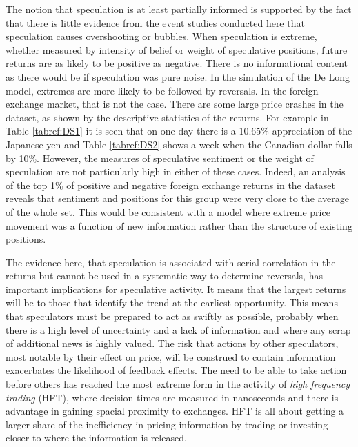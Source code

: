 \documentclass[12pt, a4paper, oneside]{article} %
\begin{document}
The notion that speculation is at least partially informed is supported by the fact that there is little evidence from the event studies conducted here that speculation causes overshooting or bubbles.  When speculation is extreme, whether measured by intensity of belief or weight of speculative positions, future returns are as likely to be positive as negative.  There is no informational content as there would be if speculation was pure noise.  In the simulation of the De Long model, extremes are more likely to be followed by reversals.  In the foreign exchange market, that is not the case.  There are some large price crashes in the dataset, as shown by the descriptive statistics of the returns. For example  in Table \ref{tabref:DS1} it is seen that on one day there is a 10.65\% appreciation of the Japanese yen and Table \ref{tabref:DS2} shows a week when the Canadian dollar falls by 10\%.  However, the measures of speculative sentiment or the weight of speculation are not particularly high in either of these cases.  Indeed, an analysis of the top 1\% of positive and negative foreign exchange returns in the dataset reveals that sentiment and positions for this group were very close to the average of the whole set.  This would be consistent with a model where extreme price movement was a function of new information rather than the structure of existing positions.    
 
The evidence here, that speculation is associated with serial correlation in the returns but cannot be used in a systematic way to determine reversals, has important implications for speculative activity.  It means that the largest returns will be to those that identify the trend at the earliest opportunity.  This means that speculators must be prepared to act as swiftly as possible, probably when there is a high level of uncertainty and a lack of information and where any scrap of additional news is highly valued.   The risk that actions by other speculators, most notable by their effect on price, will be construed to contain information exacerbates the likelihood of feedback effects.  The need to be able to take action before others has reached the most extreme form in the activity of \emph{high frequency trading} (HFT), where decision times are measured in nanoseconds and there is advantage in gaining spacial proximity to exchanges.  HFT is all about getting  a larger share of the inefficiency in pricing information by trading or investing closer to where the information is released.  
\end{document}
